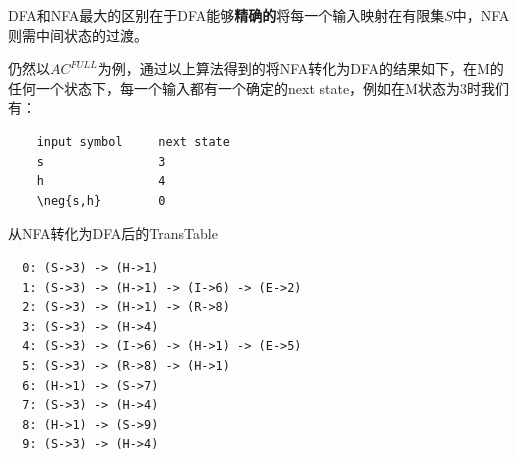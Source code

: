 \documentclass{article}
\begin{document}
DFA和NFA最大的区别在于DFA能够\textbf{精确的}将每一个输入映射在有限集$S$中，NFA则需中间状态的过渡。

仍然以$AC^{FULL}$为例，通过以上算法得到的将NFA转化为DFA的结果如下，在M的任何一个状态下，每一个输入都有一个确定的next state，例如在M状态为3时我们有：
\begin{verbatim}
    input symbol     next state
    s                3
    h                4
    \neg{s,h}        0
\end{verbatim}
从NFA转化为DFA后的TransTable
\begin{verbatim}
  0: (S->3) -> (H->1)
  1: (S->3) -> (H->1) -> (I->6) -> (E->2)
  2: (S->3) -> (H->1) -> (R->8)
  3: (S->3) -> (H->4)
  4: (S->3) -> (I->6) -> (H->1) -> (E->5)
  5: (S->3) -> (R->8) -> (H->1)
  6: (H->1) -> (S->7)
  7: (S->3) -> (H->4)
  8: (H->1) -> (S->9)
  9: (S->3) -> (H->4)
\end{verbatim}
\end{document}
